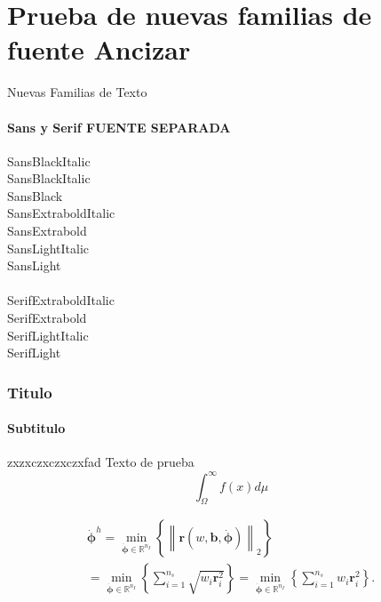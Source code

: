 \documentclass[]{beamer} %
\begin{document}
\section{Prueba de nuevas familias de fuente Ancizar}
\begin{frame}{Nuevas Familias de Texto}
	\framesubtitle{Sans y Serif FUENTE SEPARADA}
	
	
	{\SansBlackItalic     SansBlackItalic    } \\
	{\SansBlackItalic     SansBlackItalic    } \\
	{\SansBlack           SansBlack          } \\
	{\SansExtraboldItalic SansExtraboldItalic} \\
	{\SansExtrabold       SansExtrabold      } \\
	{\SansLightItalic     SansLightItalic    } \\
	{\SansLight           SansLight          } \\~\\
 	
 	{\SerifExtraboldItalic SerifExtraboldItalic} \\
 	{\SerifExtrabold       SerifExtrabold      } \\
 	{\SerifLightItalic     SerifLightItalic    } \\
 	{\SerifLight           SerifLight          } \\
 	
	
\end{frame}





\begin{frame}
	\frametitle{Titulo}
	\framesubtitle{Subtitulo} 
  zxzxczxczxczxfad
  Texto de prueba
  \begin{equation}
  	\int_{\Omega}^{\infty}f(x)d\mu
  \end{equation}

  \begin{multline}
  	\label{LeastSquares}
  	\dot{\mathbf{\phi}}^h=\min_{\dot{\mathbf{\phi}}\in\mathbb{R}^{n_{I}}} \left\lbrace \left\|\mathbf{r}(w,\mathbf{b},\dot{\mathbf{\phi}}) \right\|_2  \right\rbrace\\
  	=\min_{\dot{\mathbf{\phi}}\in\mathbb{R}^{n_{I}}} \left\lbrace \sum_{i=1}^{n_s} \sqrt{w_i\mathbf{r}_i^2}  \right\rbrace =\min_{\dot{\mathbf{\phi}}\in\mathbb{R}^{n_{I}}} \left\lbrace \sum_{i=1}^{n_s} {w_i\mathbf{r}_i^2}  \right\rbrace.
  \end{multline}

  
\end{frame}
	
\end{document}
